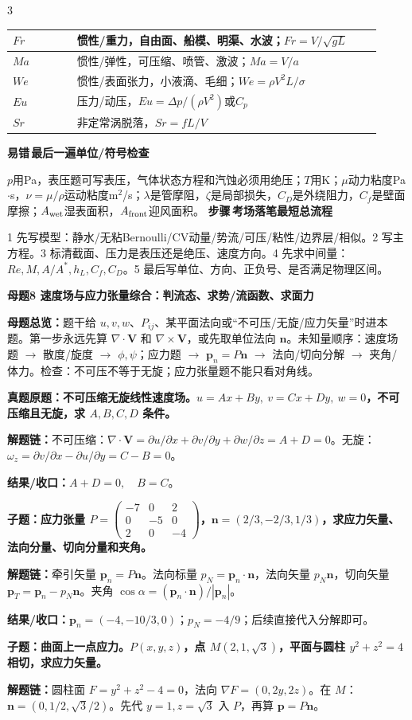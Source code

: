 \documentclass[a4paper]{article}
\newcommand{\mt}[1]{\vspace{0.45pt}\colorbox{M}{\parbox{\dimexpr\linewidth-2\fboxsep}{\color{white}\bfseries #1}}\par}
\newcommand{\qt}[1]{\vspace{0.25pt}\colorbox{Q}{\parbox{\dimexpr\linewidth-2\fboxsep}{\color{white}\bfseries #1}}\par}
\newcommand{\ans}[1]{\colorbox{G}{\parbox{\dimexpr\linewidth-2\fboxsep}{#1}}\par}
\newcommand{\chain}[1]{{\color{A}\bfseries 解题链：}#1\par}
\newcommand{\res}[1]{{\color{E}\bfseries 结果/收口：}#1\par}
\newcommand{\labtag}[3]{{\bfseries\color{#1}\colorbox{#1}{\color{white}\fontsize{2.35}{2.48}\selectfont #2}\,#3}\par}
\newcommand{\step}[1]{\labtag{S}{步骤}{#1}}
\newcommand{\err}[1]{\labtag{R}{易错}{#1}}
\newcommand{\mview}[1]{\ans{\textbf{母题总览：}#1}}
\newcommand{\stepq}[1]{\step{#1}}
\newcommand{\errq}[1]{\err{#1}}
\newenvironment{vfourWrap}{\par\begingroup\fontsize{2.68}{2.84}\selectfont\setlength{\fboxsep}{0.45pt}}{\par\endgroup}
\begin{document}
\begin{multicols}{3}
\begin{vfourWrap}
\begin{tabular}{|p{0.16\linewidth}|p{0.76\linewidth}|}
$Fr$ & 惯性/重力，自由面、船模、明渠、水波；$Fr=V/\sqrt{gL}$\\ \hline
$Ma$ & 惯性/弹性，可压缩、喷管、激波；$Ma=V/a$\\ \hline
$We$ & 惯性/表面张力，小液滴、毛细；$We=\rho V^2L/\sigma$\\ \hline
$Eu$ & 压力/动压，$Eu=\Delta p/(\rho V^2)$或$C_p$\\ \hline
$Sr$ & 非定常涡脱落，$Sr=fL/V$\\ \hline
\end{tabular}
\errq{最后一遍单位/符号检查}
$p$用Pa，表压题可写表压，气体状态方程和汽蚀必须用绝压；$T$用K；$\mu$动力粘度Pa$\cdot$s，$\nu=\mu/\rho$运动粘度m$^2$/s；$\lambda$是管摩阻，$\zeta$是局部损失，$C_D$是外绕阻力，$C_f$是壁面摩擦；$A_{\rm wet}$湿表面积，$A_{\rm front}$迎风面积。
\stepq{考场落笔最短总流程}
1 先写模型：静水/无粘Bernoulli/CV动量/势流/可压/粘性/边界层/相似。2 写主方程。3 标清截面、压力是表压还是绝压、速度方向。4 先求中间量：$Re,M,A/A^*,h_L,C_f,C_D$。5 最后写单位、方向、正负号、是否满足物理区间。
\end{vfourWrap}
\mt{母题8 速度场与应力张量综合：判流态、求势/流函数、求面力}
\mview{题干给 $u,v,w$、$P_{ij}$、某平面法向或“不可压/无旋/应力矢量”时进本题。第一步永远先算 $\nabla\cdot\bm V$ 和 $\nabla\times\bm V$，或先取单位法向 $\bm n$。未知量顺序：速度场题 $\to$ 散度/旋度 $\to$ $\phi,\psi$；应力题 $\to$ $\bm p_n=P\bm n$ $\to$ 法向/切向分解 $\to$ 夹角/体力。检查：不可压不等于无旋；应力张量题不能只看对角线。}
\qt{真题原题：不可压缩无旋线性速度场。$u=Ax+By,\ v=Cx+Dy,\ w=0$，不可压缩且无旋，求 $A,B,C,D$ 条件。}
\chain{不可压缩：$\nabla\cdot\bm V=\partial u/\partial x+\partial v/\partial y+\partial w/\partial z=A+D=0$。无旋：$\omega_z=\partial v/\partial x-\partial u/\partial y=C-B=0$。}
\res{$A+D=0,\quad B=C$。}

\qt{子题：应力张量 $P=\begin{pmatrix}-7&0&2\\0&-5&0\\2&0&-4\end{pmatrix}$，$\bm n=(2/3,-2/3,1/3)$，求应力矢量、法向分量、切向分量和夹角。}
\chain{牵引矢量 $\bm p_n=P\bm n$。法向标量 $p_N=\bm p_n\cdot\bm n$，法向矢量 $p_N\bm n$，切向矢量 $\bm p_T=\bm p_n-p_N\bm n$。夹角 $\cos\alpha=(\bm p_n\cdot\bm n)/|\bm p_n|$。}
\res{$\bm p_n=(-4,-10/3,0)$；$p_N=-4/9$；后续直接代入分解即可。}

\qt{子题：曲面上一点应力。$P(x,y,z)$，点 $M(2,1,\sqrt3)$，平面与圆柱 $y^2+z^2=4$ 相切，求应力矢量。}
\chain{圆柱面 $F=y^2+z^2-4=0$，法向 $\nabla F=(0,2y,2z)$。在 $M$：$\bm n=(0,1/2,\sqrt3/2)$。先代 $y=1,z=\sqrt3$ 入 $P$，再算 $\bm p=P\bm n$。}


\end{multicols}
\end{document}
